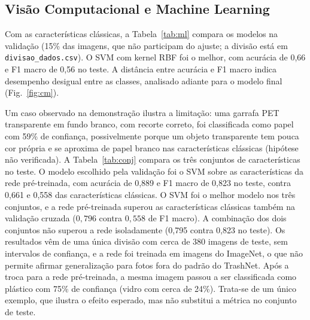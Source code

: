 \documentclass[conference]{IEEEtran}
\begin{document}
\subsection{Visão Computacional e Machine Learning}
Com as características clássicas, a Tabela~\ref{tab:ml} compara os modelos na validação (15\% das imagens, que não participam do ajuste; a divisão está em \texttt{divisao\_dados.csv}). O SVM com kernel RBF foi o melhor, com acurácia de 0,66 e F1 macro de 0,56 no teste. A distância entre acurácia e F1 macro indica desempenho desigual entre as classes, analisado adiante para o modelo final (Fig.~\ref{fig:cm}).

Um caso observado na demonstração ilustra a limitação: uma garrafa PET transparente em fundo branco, com recorte correto, foi classificada como papel com 59\% de confiança, possivelmente porque um objeto transparente tem pouca cor própria e se aproxima de papel branco nas características clássicas (hipótese não verificada). A Tabela~\ref{tab:conj} compara os três conjuntos de características no teste. O modelo escolhido pela validação foi o SVM sobre as características da rede pré-treinada, com acurácia de 0,889 e F1 macro de 0,823 no teste, contra 0,661 e 0,558 das características clássicas. O SVM foi o melhor modelo nos três conjuntos, e a rede pré-treinada superou as características clássicas também na validação cruzada ($0{,}796$ contra $0{,}558$ de F1 macro). A combinação dos dois conjuntos não superou a rede isoladamente (0,795 contra 0,823 no teste). Os resultados vêm de uma única divisão com cerca de 380 imagens de teste, sem intervalos de confiança, e a rede foi treinada em imagens do ImageNet, o que não permite afirmar generalização para fotos fora do padrão do TrashNet. Após a troca para a rede pré-treinada, a mesma imagem passou a ser classificada como plástico com 75\% de confiança (vidro com cerca de 24\%). Trata-se de um único exemplo, que ilustra o efeito esperado, mas não substitui a métrica no conjunto de teste.
\end{document}
